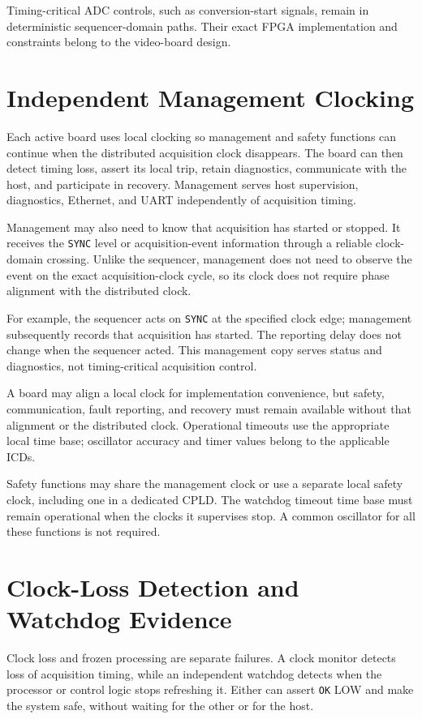 Timing-critical ADC controls, such as conversion-start signals, remain in deterministic sequencer-domain paths. Their exact FPGA implementation and constraints belong to the video-board design.

\section{Independent Management Clocking}

Each active board uses local clocking so management and safety functions can continue when the distributed acquisition clock disappears. The board can then detect timing loss, assert its local trip, retain diagnostics, communicate with the host, and participate in recovery. Management serves host supervision, diagnostics, Ethernet, and UART independently of acquisition timing.

Management may also need to know that acquisition has started or stopped. It receives the \texttt{SYNC} level or acquisition-event information through a reliable clock-domain crossing. Unlike the sequencer, management does not need to observe the event on the exact acquisition-clock cycle, so its clock does not require phase alignment with the distributed clock.

For example, the sequencer acts on \texttt{SYNC} at the specified clock edge; management subsequently records that acquisition has started. The reporting delay does not change when the sequencer acted. This management copy serves status and diagnostics, not timing-critical acquisition control.

A board may align a local clock for implementation convenience, but safety, communication, fault reporting, and recovery must remain available without that alignment or the distributed clock. Operational timeouts use the appropriate local time base; oscillator accuracy and timer values belong to the applicable ICDs.

Safety functions may share the management clock or use a separate local safety clock, including one in a dedicated CPLD. The watchdog timeout time base must remain operational when the clocks it supervises stop. A common oscillator for all these functions is not required.

\section{Clock-Loss Detection and Watchdog Evidence}

Clock loss and frozen processing are separate failures. A clock monitor detects loss of acquisition timing, while an independent watchdog detects when the processor or control logic stops refreshing it. Either can assert \texttt{OK} LOW and make the system safe, without waiting for the other or for the host.

